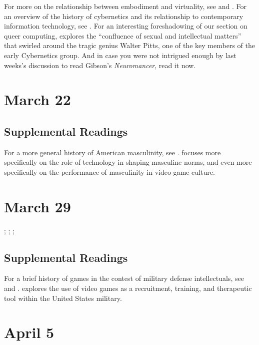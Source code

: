 \documentclass[11pt]{article}
\begin{document}
For more on the relationship between embodiment and virtuality, see \cite{Stone:1996wp} and \cite{Balsamo:1996uc}.  For an overview of the history of cybernetics and its relationship to contemporary information technology, see \cite{Kline:2015ti}.  For an interesting foreshadowing of our section on queer computing, \cite{Wilson:2009wm} explores the ``confluence of sexual and intellectual matters'' that swirled around the tragic genius Walter Pitts, one of the key members of the early Cybernetics group. And in case you were not intrigued enough by last weeks's discussion to read Gibson's \emph{Neuromancer}, read it now.

\section{March 22}
\label{sec:orgfbd6b72}


\subsection{Supplemental Readings}
\label{sec:org719874e}

For a more general history of American masculinity, see \cite{Rotundo:1994ts}. \cite{Mellstrom:2004ur} focuses more specifically on the role of technology in shaping masculine norms, and \cite{Burrill2008} even more specifically on the performance of masculinity in video game culture.

\section{March 29}
\label{sec:orgaec800e}

; ; ; 


\subsection{Supplemental Readings}
For a brief history of games in the contest of military defense intellectuals, see \cite{GhamariTabrizi:2000wh} and \cite{JenniferLight:2008ck}. \cite{Mead:2013vv} explores the use of video games as a recruitment, training, and therapeutic tool within the United States military.

\section{April 5}
\label{sec:org220c962}
\end{document}
